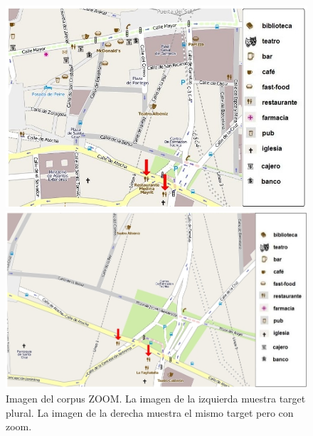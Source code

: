 
\begin{figure}
\begin{minipage}[b]{0.48\linewidth}
\centering
\includegraphics[width=\textwidth]{images/corpus/mapa10.png}
\caption{}
\label{mapa17}
\end{minipage}
\hspace*{0cm}
\begin{minipage}[b]{0.55\linewidth}
\centering
\includegraphics[width=\textwidth]{images/corpus/mapa20.png}
\caption{}
\label{mapa18}
\end{minipage}
\caption{Imagen del corpus ZOOM. La imagen de la izquierda muestra target plural. La imagen de la derecha muestra el mismo target pero con zoom.}

\end{figure}

